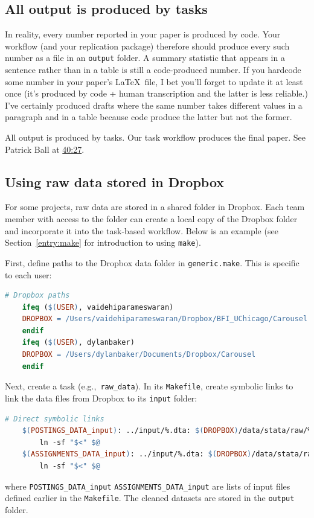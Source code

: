 \subsection{All output is produced by tasks}

In reality, every number reported in your paper is produced by code.
Your workflow (and your replication package) therefore should produce every such number as a file in an \texttt{output} folder.
A summary statistic that appears in a sentence rather than in a table is still a code-produced number.
If you hardcode some number in your paper's \LaTeX\ file, I bet you'll forget to update it at least once (it's produced by code + human transcription and the latter is less reliable.)
I've certainly produced drafts where the same number takes different values in a paragraph and in a table because code produce the latter but not the former.

All output is produced by tasks.
Our task workflow produces the final paper.
See Patrick Ball at \href{https://www.youtube.com/watch?v=ZSunU9GQdcI&t=40m27s}{40:27}.

\subsection{Using raw data stored in Dropbox}

For some projects, raw data are stored in a shared folder in Dropbox. 
Each team member with access to the folder can create a local copy of the Dropbox folder 
and incorporate it into the task-based workflow. 
Below is an example (see Section~\ref{entry:make} for introduction to using \texttt{make}).

First, define paths to the Dropbox data folder in \texttt{generic.make}. 
This is specific to each user:
\begin{lstlisting}[language=make]
	# Dropbox paths
	ifeq ($(USER), vaidehiparameswaran)
	DROPBOX = /Users/vaidehiparameswaran/Dropbox/BFI_UChicago/Carousel
	endif
	ifeq ($(USER), dylanbaker)
	DROPBOX = /Users/dylanbaker/Documents/Dropbox/Carousel
	endif
\end{lstlisting}

Next, create a task (e.g.,~\texttt{raw\_data}). 
In its \texttt{Makefile}, create symbolic links 
to link the data files from Dropbox to its \texttt{input} folder:
\begin{lstlisting}[language=make]
	# Direct symbolic links
	$(POSTINGS_DATA_input): ../input/%.dta: $(DROPBOX)/data/stata/raw/%.dta | ../input
		ln -sf "$<" $@
	$(ASSIGNMENTS_DATA_input): ../input/%.dta: $(DROPBOX)/data/stata/raw/%.dta | ../input
		ln -sf "$<" $@
\end{lstlisting}
where \texttt{POSTINGS\_DATA\_input} \texttt{ASSIGNMENTS\_DATA\_input} 
are lists of input files defined earlier in the \texttt{Makefile}. 
The cleaned datasets are stored in the \texttt{output} folder.
